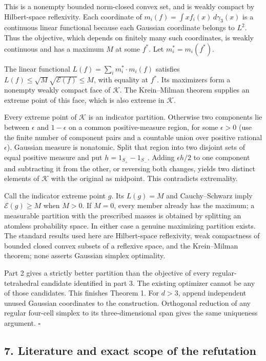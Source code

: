\documentclass[
  11pt,
]{article}
\begin{document}
This is a nonempty bounded norm-closed convex set, and is weakly compact
by Hilbert-space reflexivity. Each coordinate of
\(m_i(f)=\int x f_i(x)\,d\gamma_3(x)\) is a continuous linear functional
because each Gaussian coordinate belongs to \(L^2\). Thus the objective,
which depends on finitely many such coordinates, is weakly continuous
and has a maximum \(M\) at some \(f^*\). Let \(m_i^*=m_i(f^*)\).

The linear functional \(L(f)=\sum_i m_i^*\cdot m_i(f)\) satisfies
\(L(f)\le\sqrt M\sqrt{\mathcal E(f)}\le M\), with equality at \(f^*\).
Its maximizers form a nonempty weakly compact face of \(\mathcal K\).
The Krein--Milman theorem supplies an extreme point of this face, which
is also extreme in \(\mathcal K\).

Every extreme point of \(\mathcal K\) is an indicator partition.
Otherwise two components lie between \(\epsilon\) and \(1-\epsilon\) on
a common positive-measure region, for some \(\epsilon>0\) (use the
finite number of component pairs and a countable union over positive
rational \(\epsilon\)). Gaussian measure is nonatomic. Split that region
into two disjoint sets of equal positive measure and put
\(h=1_{S_+}-1_{S_-}\). Adding \(\epsilon h/2\) to one component and
subtracting it from the other, or reversing both changes, yields two
distinct elements of \(\mathcal K\) with the original as midpoint. This
contradicts extremality.

Call the indicator extreme point \(g\). Its \(L(g)=M\) and
Cauchy--Schwarz imply \(\mathcal E(g)\ge M\) when \(M>0\). If \(M=0\),
every member already has the maximum; a measurable partition with the
prescribed masses is obtained by splitting an atomless probability
space. In either case a genuine maximizing partition exists. The
standard results used here are Hilbert-space reflexivity, weak
compactness of bounded closed convex subsets of a reflexive space, and
the Krein--Milman theorem; none asserts Gaussian simplex optimality.

Part 2 gives a strictly better partition than the objective of every
regular-tetrahedral candidate identified in part 3. The existing
optimizer cannot be any of those candidates. This finishes Theorem 1.
For \(d>3\), append independent unused Gaussian coordinates to the
construction. Orthogonal reduction of any regular four-cell simplex to
its three-dimensional span gives the same uniqueness argument.
\(\square\)

\subsection{7. Literature and exact scope of the
refutation}\label{literature-and-exact-scope-of-the-refutation}
\end{document}
